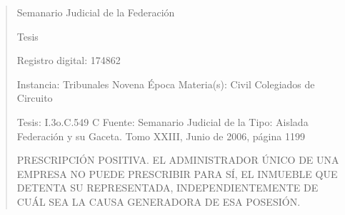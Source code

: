 \documentclass[11pt,a4paper]{article}
\begin{document}
\begin{quote}
                                                   Semanario Judicial de la Federación

                                                  Tesis

 Registro digital: 174862

 Instancia: Tribunales            Novena Época                          Materia(s): Civil
 Colegiados de Circuito

 Tesis: I.3o.C.549 C              Fuente: Semanario Judicial de la      Tipo: Aislada
                                  Federación y su Gaceta.
                                  Tomo XXIII, Junio de 2006, página
                                  1199


PRESCRIPCIÓN POSITIVA. EL ADMINISTRADOR ÚNICO DE UNA EMPRESA NO PUEDE
PRESCRIBIR PARA SÍ, EL INMUEBLE QUE DETENTA SU REPRESENTADA,
INDEPENDIENTEMENTE DE CUÁL SEA LA CAUSA GENERADORA DE ESA POSESIÓN.



\end{quote}
\end{document}
